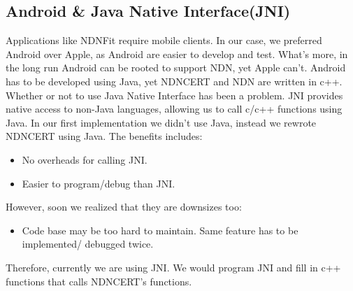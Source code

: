 \documentclass[a0,portrait]{poster}
\begin{document}
\begin{multicols}{2}
\subsection*{Android \& Java Native Interface(JNI)}
\par 
	Applications like NDNFit require mobile clients. 
	In our case, we preferred Android over Apple, as Android are easier to develop and test.
	What's more, in the long run Android can be rooted to support NDN, yet Apple can't.
	Android has to be developed using Java, yet NDNCERT and NDN are written in c++. Whether or not to use Java Native Interface has been a problem. JNI provides native access to non-Java languages, allowing us to call c/c++ functions using Java. In our first implementation we didn't use Java, instead we rewrote NDNCERT using Java. The benefits includes:
	\begin{itemize}
		\item No overheads for calling JNI.
		\item Easier to program/debug than JNI.
	\end{itemize}
\par
	However, soon we realized that they are downsizes too:
	\begin{itemize}
		\item Code base may be too hard to maintain. Same feature has to be implemented/ debugged twice.
	\end{itemize}
\par
	Therefore, currently we are using JNI. We would program JNI and fill in c++ functions that calls NDNCERT's functions.



\end{multicols}
\end{document}
